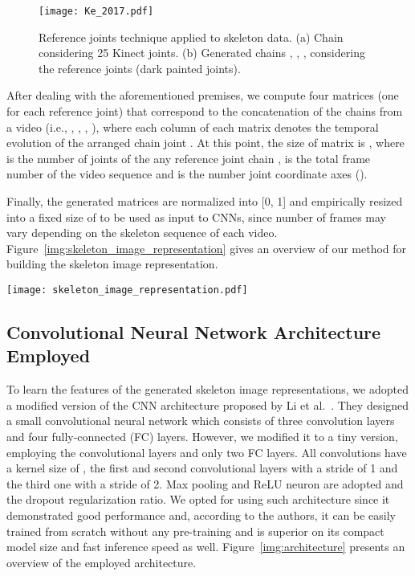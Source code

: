 \documentclass[10pt,conference]{IEEEtran}
\begin{document}
\begin{figure}[t]
\centering
	\texttt{[image: Ke\_2017.pdf]}
	\caption{Reference joints technique applied to skeleton data. (a) Chain  considering 25 Kinect joints. (b) Generated chains , , ,  considering the reference joints (dark painted joints).}
	\label{img:ke_2017}
\end{figure}

After dealing with the aforementioned premises, we compute four matrices  (one for each reference joint) that correspond to the concatenation of the chains  from a video (i.e., , , , ), where each column of each matrix denotes the temporal evolution of the arranged chain joint . At this point, the size of matrix  is , where  is the number of joints of the any reference joint chain ,  is the total frame number of the video sequence and  is the number joint coordinate axes ().

Finally, the generated matrices are normalized into [0, 1] and empirically resized into a fixed size of  to be used as input to CNNs, since number of frames may vary depending on the skeleton sequence of each video. Figure~\ref{img:skeleton_image_representation} gives an overview of our method for building the skeleton image representation.

\begin{figure*}[!t]
\centering
	\texttt{[image: skeleton\_image\_representation.pdf]}
	\caption{Proposed skeleton image representation.}
	\label{img:skeleton_image_representation}
\end{figure*}

\subsection{Convolutional Neural Network Architecture Employed}

To learn the features of the generated skeleton image representations, we adopted a modified version of the CNN architecture proposed by Li et al.~\cite{Li:2017}. They designed a small convolutional neural network which consists of three convolution layers and four fully-connected (FC) layers. However, we modified it to a tiny version, employing the convolutional layers and only two FC layers. All convolutions have a kernel size of , the first and second convolutional layers with a stride of 1 and the third one with a stride of 2. Max pooling and ReLU neuron are adopted and the dropout regularization ratio. We opted for using such architecture since it demonstrated good performance and, according to the authors, it can be easily trained from scratch without any pre-training and is superior on its compact model size and fast inference speed as well. Figure~\ref{img:architecture} presents an overview of the employed architecture.
\end{document}
